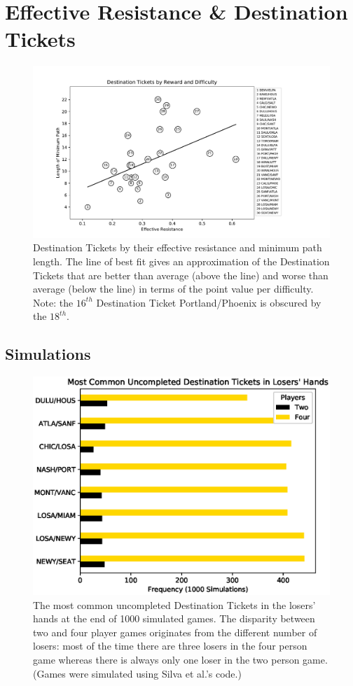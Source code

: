 \section{Effective Resistance \& Destination Tickets}

\begin{figure}[!ht]
\centering
\includegraphics[scale=.8]{figures/resistance}
\caption{Destination Tickets by their effective
resistance and minimum path length.
The line of best fit gives an approximation of the
Destination Tickets that are better than average (above the line)
and worse than average (below the line) in terms
of the point value per difficulty.
Note: the $16^{th}$ Destination Ticket Portland/Phoenix is obscured
by the $18^{th}$.}
\label{fig:resistance}
\end{figure}

\subsection{Simulations}

\begin{figure}[!ht]
\centering
\includegraphics[scale=.8]{figures/uncompleted}
\caption{The most common uncompleted
Destination Tickets in the losers'
hands at the end of 1000 simulated games.
The disparity between two and four player
games originates from the different number
of losers: most of the time there are three 
losers in the four person game whereas there is 
always only one loser in the two person game.
(Games were simulated using
Silva et al.'s code.)}
\label{fig:uncompleted}
\end{figure}

